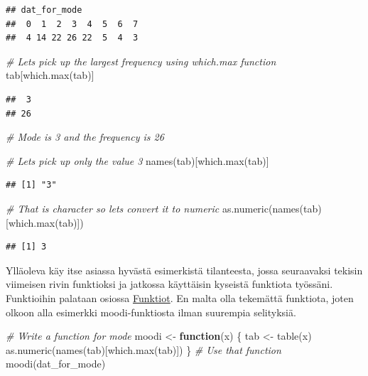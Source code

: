 \documentclass[
]{book}
\newenvironment{Shaded}{\begin{snugshade}}{\end{snugshade}}
\newcommand{\CommentTok}[1]{\textcolor[rgb]{0.56,0.35,0.01}{\textit{#1}}}
\newcommand{\ControlFlowTok}[1]{\textcolor[rgb]{0.13,0.29,0.53}{\textbf{#1}}}
\newcommand{\FunctionTok}[1]{\textcolor[rgb]{0.00,0.00,0.00}{#1}}
\newcommand{\NormalTok}[1]{#1}
\newcommand{\OtherTok}[1]{\textcolor[rgb]{0.56,0.35,0.01}{#1}}
\begin{document}
\begin{verbatim}
## dat_for_mode
##  0  1  2  3  4  5  6  7 
##  4 14 22 26 22  5  4  3
\end{verbatim}

\begin{Shaded}
\begin{Highlighting}[]
\CommentTok{\# Let\textquotesingle{}s pick up the largest frequency using which.max function}
\NormalTok{tab[}\FunctionTok{which.max}\NormalTok{(tab)]}
\end{Highlighting}
\end{Shaded}

\begin{verbatim}
##  3 
## 26
\end{verbatim}

\begin{Shaded}
\begin{Highlighting}[]
\CommentTok{\# Mode is 3 and the frequency is 26}

\CommentTok{\# Let\textquotesingle{}s pick up only the value 3}
\FunctionTok{names}\NormalTok{(tab)[}\FunctionTok{which.max}\NormalTok{(tab)]}
\end{Highlighting}
\end{Shaded}

\begin{verbatim}
## [1] "3"
\end{verbatim}

\begin{Shaded}
\begin{Highlighting}[]
\CommentTok{\# That is character so let\textquotesingle{}s convert it to numeric}
\FunctionTok{as.numeric}\NormalTok{(}\FunctionTok{names}\NormalTok{(tab)[}\FunctionTok{which.max}\NormalTok{(tab)])}
\end{Highlighting}
\end{Shaded}

\begin{verbatim}
## [1] 3
\end{verbatim}

Ylläoleva käy itse asiassa hyvästä esimerkistä tilanteesta, jossa seuraavaksi tekisin viimeisen rivin funktioksi ja jatkossa käyttäisin kyseistä funktiota työssäni. Funktioihin palataan osiossa \protect\hyperlink{functions}{Funktiot}. En malta olla tekemättä funktiota, joten olkoon alla esimerkki moodi-funktiosta ilman suurempia selityksiä.

\begin{Shaded}
\begin{Highlighting}[]
\CommentTok{\# Write a function for mode}
\NormalTok{moodi }\OtherTok{\textless{}{-}} \ControlFlowTok{function}\NormalTok{(x) \{}
\NormalTok{  tab }\OtherTok{\textless{}{-}} \FunctionTok{table}\NormalTok{(x)}
  \FunctionTok{as.numeric}\NormalTok{(}\FunctionTok{names}\NormalTok{(tab)[}\FunctionTok{which.max}\NormalTok{(tab)])}
\NormalTok{\}}
\CommentTok{\# Use that function}
\FunctionTok{moodi}\NormalTok{(dat\_for\_mode)}
\end{Highlighting}
\end{Shaded}
\end{document}
